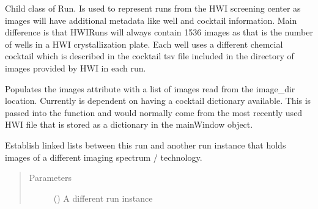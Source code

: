 \documentclass[letterpaper,10pt,english]{sphinxmanual}
\begin{document}
\begin{fulllineitems}
\begin{fulllineitems}
\label{\detokenize{polo.crystallography:polo.crystallography.run.HWIRun.AllOWED_PLOTS}}
Child class of Run. Is used to represent runs from the HWI screening center
as images will have additional metadata like well and cocktail information.
Main difference is that HWIRuns will always contain 1536 images as that is
the number of wells in a HWI crystallization plate. Each well uses a
different chemcial cocktail which is described in the cocktail tsv file
included in the directory of images provided by HWI in each run.

\end{fulllineitems}


\begin{fulllineitems}
\label{\detokenize{polo.crystallography:polo.crystallography.run.HWIRun.add_images_from_dir}}
Populates the images attribute with a list of images read from the
image\_dir location. Currently is dependent on having a cocktail
dictionary available. This is passed into the function and would
normally come from the most recently used HWI file that is
stored as a dictionary in the mainWindow object.

\end{fulllineitems}


\begin{fulllineitems}
\label{\detokenize{polo.crystallography:polo.crystallography.run.HWIRun.link_to_alt_images}}
Establish linked lists between this run and another run instance
that holds images of a different imaging spectrum / technology.
\begin{quote}\begin{description}
\item[{Parameters}] \leavevmode
{} ({\hyperref[\detokenize{polo.crystallography:polo.crystallography.run.Run}]{}}) \textendash{} A different run instance


\end{description}
\end{quote}
\end{fulllineitems}
\end{fulllineitems}
\end{document}
